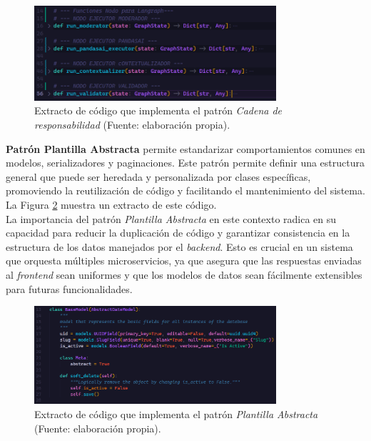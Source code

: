 \begin{figure}[htbp]
	\centering
	\includegraphics[width=0.8\textwidth]{images/cadena.PNG}
	\caption{Extracto de código que implementa el patrón \textit{Cadena de responsabilidad} (Fuente: elaboración propia).}
	\label{fig:codigo_workflow}
\end{figure}

\textbf{Patrón Plantilla Abstracta} permite estandarizar comportamientos comunes en modelos, serializadores y paginaciones. Este patrón permite definir una estructura general que puede ser heredada y personalizada por clases específicas, promoviendo la reutilización de código y facilitando el mantenimiento del sistema. La Figura \ref{fig:codigo_template_method} muestra un extracto de este código.\\
La importancia del patrón \textit{Plantilla Abstracta} en este contexto radica en su capacidad para reducir la duplicación de código y garantizar consistencia en la estructura de los datos manejados por el \textit{backend}. Esto es crucial en un sistema que orquesta múltiples microservicios, ya que asegura que las respuestas enviadas al \textit{frontend} sean uniformes y que los modelos de datos sean fácilmente extensibles para futuras funcionalidades.

\begin{figure}[htbp]
	\centering
	\includegraphics[width=0.8\textwidth]{images/codigo_template_method.png}
	\caption{Extracto de código que implementa el patrón \textit{Plantilla Abstracta} (Fuente: elaboración propia).}
	\label{fig:codigo_template_method}
\end{figure}

